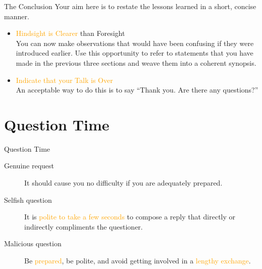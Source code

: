 \documentclass[
 size=14pt,
 paper=smartboard,  %
 mode=present, 		%
 display=slides, 	%
 style=tuliplab,  	%
 pauseslide,
 fleqn,leqno]{powerdot}
\begin{document}
\begin{slide}{The Conclusion}
Your aim here is to restate the lessons learned in a short,
concise manner.
\begin{itemize}
  \item \textcolor{orange}{Hindsight is Clearer} than Foresight\\
  You can now make observations that
  would have been confusing if they were introduced earlier.
  Use this opportunity to refer to statements that
  you have made in the previous three sections and
  weave them into a coherent synopsis.

  \item \textcolor{orange}{Indicate that your Talk is Over}\\
  An acceptable way to do this is to say ``Thank you.
  Are there any questions?''

\end{itemize}
\end{slide}

\section{Question Time}

\begin{slide}[toc=,bm=]{Question Time}
\begin{description}
  \item[Genuine request] It should cause you no difficulty if you are adequately prepared.\pause
  \item[Selfish question] It is \textcolor{orange}{polite to take a few seconds} to compose a reply that directly or indirectly compliments the questioner.\pause
  \item[Malicious question]Be \textcolor{orange}{prepared},
  be polite,
  and avoid getting involved in a \textcolor{orange}{lengthy exchange}.
\end{description}
\end{slide}
\end{document}
